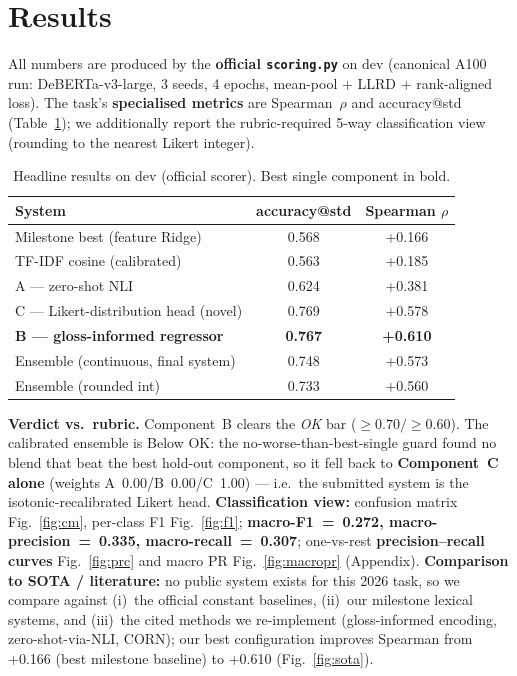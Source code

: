 \documentclass[11pt]{article}
\newcommand{\blRidgeAcc}{0.568}\newcommand{\blRidgeRho}{+0.166}
\newcommand{\blTfidfAcc}{0.563}\newcommand{\blTfidfRho}{+0.185}
\newcommand{\Aacc}{0.624}\newcommand{\Arho}{+0.381}
\newcommand{\Bacc}{0.767}\newcommand{\Brho}{+0.610}
\newcommand{\Cacc}{0.769}\newcommand{\Crho}{+0.578}
\newcommand{\EnsAcc}{0.748}\newcommand{\EnsRho}{+0.573}
\newcommand{\EnsIntAcc}{0.733}\newcommand{\EnsIntRho}{+0.560}
\newcommand{\EnsVerdict}{Below OK}              %
\newcommand{\Wa}{0.00}\newcommand{\Wb}{0.00}\newcommand{\Wc}{1.00} %
\newcommand{\MacroF}{0.272}
\newcommand{\MacroP}{0.335}
\newcommand{\MacroR}{0.307}
\begin{document}
\section{Results}
All numbers are produced by the \textbf{official \texttt{scoring.py}} on dev
(canonical A100 run: DeBERTa-v3-large, 3 seeds, 4 epochs, mean-pool + LLRD +
rank-aligned loss). The task's \textbf{specialised metrics} are Spearman~$\rho$
and accuracy@std (Table~\ref{tab:main}); we additionally report the
rubric-required 5-way classification view (rounding to the nearest Likert
integer).

\begin{table}[H]\centering
\caption{Headline results on dev (official scorer). Best single component in
bold.}\label{tab:main}
\begin{tabular}{lcc}
\toprule
System & accuracy@std & Spearman $\rho$ \\
\midrule
Milestone best (feature Ridge)            & \blRidgeAcc & \blRidgeRho \\
TF-IDF cosine (calibrated)                & \blTfidfAcc & \blTfidfRho \\
A --- zero-shot NLI                       & \Aacc & \Arho \\
C --- Likert-distribution head (novel)    & \Cacc & \Crho \\
\textbf{B --- gloss-informed regressor}   & \textbf{\Bacc} & \textbf{\Brho} \\
Ensemble (continuous, final system)       & \EnsAcc & \EnsRho \\
Ensemble (rounded int)                    & \EnsIntAcc & \EnsIntRho \\
\bottomrule
\end{tabular}
\end{table}

\noindent\textbf{Verdict vs.\ rubric.} Component~B clears the \emph{OK} bar
($\ge0.70/\ge0.60$). The calibrated ensemble is \EnsVerdict{}: the
no-worse-than-best-single guard found no blend that beat the best hold-out
component, so it fell back to \textbf{Component~C alone} (weights
A~\Wa{}/B~\Wb{}/C~\Wc{}) --- i.e.\ the submitted system is the
isotonic-recalibrated Likert head.
\textbf{Classification view:} confusion matrix
Fig.~\ref{fig:cm}, per-class F1 Fig.~\ref{fig:f1}; \textbf{macro-F1~=~\MacroF,
macro-precision~=~\MacroP, macro-recall~=~\MacroR}; one-vs-rest
\textbf{precision--recall curves} Fig.~\ref{fig:prc} and macro PR
Fig.~\ref{fig:macropr} (Appendix). \textbf{Comparison to SOTA / literature:}
no public system exists for this 2026 task, so we compare against (i)~the
official constant baselines, (ii)~our milestone lexical systems, and
(iii)~the cited methods we re-implement (gloss-informed encoding,
zero-shot-via-NLI, CORN); our best configuration improves Spearman from
\blRidgeRho{} (best milestone baseline) to \Brho{} (Fig.~\ref{fig:sota}).
\end{document}
